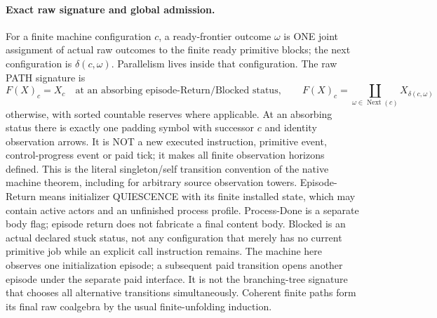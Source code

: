 \documentclass[11pt]{article}
\begin{document}
\paragraph{Exact raw signature and global admission.}
For a finite machine configuration $c$, a ready-frontier outcome $\omega$ is ONE joint assignment of actual raw outcomes to the finite ready primitive blocks; the next configuration is $\delta(c,\omega)$. Parallelism lives inside that configuration. The raw PATH signature is
\[
  F(X)_c=X_c\quad\text{at an absorbing episode-Return/Blocked status},\qquad
  F(X)_c=\coprod_{\omega\in\operatorname{Next}(c)}X_{\delta(c,\omega)}
\]
otherwise, with sorted countable reserves where applicable. At an absorbing status there is exactly one padding symbol with successor $c$ and identity observation arrows. It is NOT a new executed instruction, primitive event, control-progress event or paid tick; it makes all finite observation horizons defined. This is the literal singleton/self transition convention of the native machine theorem, including for arbitrary source observation towers. Episode-Return means initializer QUIESCENCE with its finite installed state, which may contain active actors and an unfinished process profile. Process-Done is a separate body flag; episode return does not fabricate a final content body. Blocked is an actual declared stuck status, not any configuration that merely has no current primitive job while an explicit call instruction remains. The machine here observes one initialization episode; a subsequent paid transition opens another episode under the separate paid interface. It is not the branching-tree signature that chooses all alternative transitions simultaneously. Coherent finite paths form its final raw coalgebra by the usual finite-unfolding induction.
\end{document}
